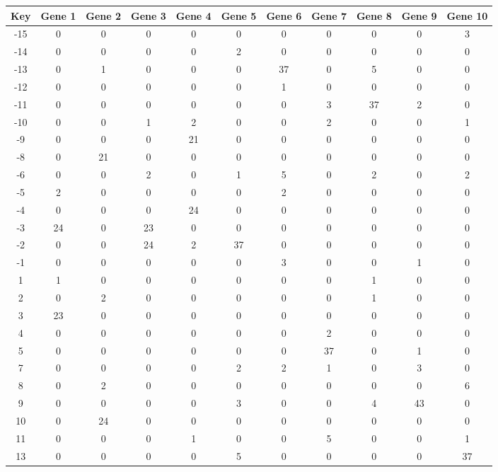 \begin{tabular}{|c|c|c|c|c|c|c|c|c|c|c|}
\hline
Key & Gene 1 & Gene 2 & Gene 3 & Gene 4 & Gene 5 & Gene 6 & Gene 7 & Gene 8 & Gene 9 & Gene 10 \\
\hline
-15 & 0 & 0 & 0 & 0 & 0 & 0 & 0 & 0 & 0 & 3 \\
-14 & 0 & 0 & 0 & 0 & 2 & 0 & 0 & 0 & 0 & 0 \\
-13 & 0 & 1 & 0 & 0 & 0 & 37 & 0 & 5 & 0 & 0 \\
-12 & 0 & 0 & 0 & 0 & 0 & 1 & 0 & 0 & 0 & 0 \\
-11 & 0 & 0 & 0 & 0 & 0 & 0 & 3 & 37 & 2 & 0 \\
-10 & 0 & 0 & 1 & 2 & 0 & 0 & 2 & 0 & 0 & 1 \\
-9 & 0 & 0 & 0 & 21 & 0 & 0 & 0 & 0 & 0 & 0 \\
-8 & 0 & 21 & 0 & 0 & 0 & 0 & 0 & 0 & 0 & 0 \\
-6 & 0 & 0 & 2 & 0 & 1 & 5 & 0 & 2 & 0 & 2 \\
-5 & 2 & 0 & 0 & 0 & 0 & 2 & 0 & 0 & 0 & 0 \\
-4 & 0 & 0 & 0 & 24 & 0 & 0 & 0 & 0 & 0 & 0 \\
-3 & 24 & 0 & 23 & 0 & 0 & 0 & 0 & 0 & 0 & 0 \\
-2 & 0 & 0 & 24 & 2 & 37 & 0 & 0 & 0 & 0 & 0 \\
-1 & 0 & 0 & 0 & 0 & 0 & 3 & 0 & 0 & 1 & 0 \\
1 & 1 & 0 & 0 & 0 & 0 & 0 & 0 & 1 & 0 & 0 \\
2 & 0 & 2 & 0 & 0 & 0 & 0 & 0 & 1 & 0 & 0 \\
3 & 23 & 0 & 0 & 0 & 0 & 0 & 0 & 0 & 0 & 0 \\
4 & 0 & 0 & 0 & 0 & 0 & 0 & 2 & 0 & 0 & 0 \\
5 & 0 & 0 & 0 & 0 & 0 & 0 & 37 & 0 & 1 & 0 \\
7 & 0 & 0 & 0 & 0 & 2 & 2 & 1 & 0 & 3 & 0 \\
8 & 0 & 2 & 0 & 0 & 0 & 0 & 0 & 0 & 0 & 6 \\
9 & 0 & 0 & 0 & 0 & 3 & 0 & 0 & 4 & 43 & 0 \\
10 & 0 & 24 & 0 & 0 & 0 & 0 & 0 & 0 & 0 & 0 \\
11 & 0 & 0 & 0 & 1 & 0 & 0 & 5 & 0 & 0 & 1 \\
13 & 0 & 0 & 0 & 0 & 5 & 0 & 0 & 0 & 0 & 37 \\
\hline
\end{tabular}
